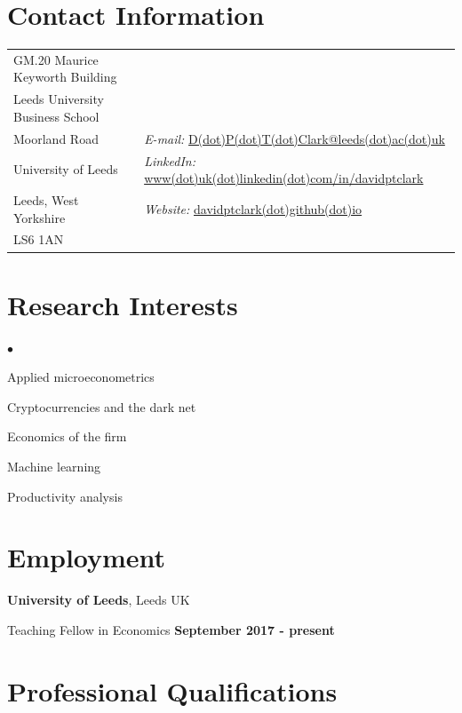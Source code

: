 \documentclass[margin,line,9pt]{res}
\newenvironment{list1}{
  \begin{list}{\ding{113}}{%
      \setlength{\itemsep}{0in}
      \setlength{\parsep}{0in} \setlength{\parskip}{0in}
      \setlength{\topsep}{0in} \setlength{\partopsep}{0in}
      \setlength{\leftmargin}{0.17in}}}{\end{list}}
\newenvironment{list2}{
  \begin{list}{$\bullet$}{%
      \setlength{\itemsep}{0in}
      \setlength{\parsep}{0in} \setlength{\parskip}{0in}
      \setlength{\topsep}{0in} \setlength{\partopsep}{0in}
      \setlength{\leftmargin}{0.2in}}}{\end{list}}
\begin{document}

\begin{resume}
\section{\sc Contact Information}
\vspace{.05in}
\begin{tabular}{@{}p{2.5in}p{4in}}
GM.20 Maurice Keyworth Building & \\
Leeds University Business School & \\
Moorland Road  & {\it E-mail:}  \href{mailto:D.P.T.Clark@leeds.ac.uk}{D(dot)P(dot)T(dot)Clark@leeds(dot)ac(dot)uk}\\
University of Leeds   & {\it LinkedIn:} \href{http://www.linkedin.com/in/davidptclark}{www(dot)uk(dot)linkedin(dot)com/in/davidptclark}\\
Leeds, West Yorkshire & {\it Website:} \href{http://davidptclark.github.io}{davidptclark(dot)github(dot)io} \\
LS6 1AN & \\
\end{tabular}

\section{\sc Research Interests}
\begin{list2}
\item Applied microeconometrics
\item Cryptocurrencies and the dark net
\item Economics of the firm
\item Machine learning
\item Productivity analysis
\end{list2}

\section{\sc Employment}
{\bf University of Leeds}, Leeds UK\\
\vspace*{-.1in}
\begin{list1}
\item[]Teaching Fellow in Economics  \hfill {\bf September 2017 - present}
\end{list1}
\vspace*{.1in}
\section{\sc Professional Qualifications}


\end{resume}
\end{document}
